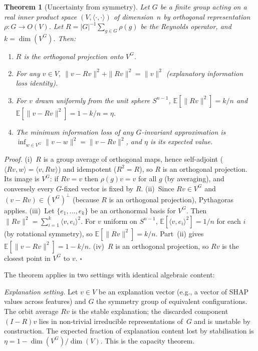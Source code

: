 \documentclass[11pt,a4paper]{article}
\newtheorem{theorem}{Theorem}[section]
\begin{document}
\begin{theorem}[Uncertainty from symmetry]
\label{thm:uncertainty-from-symmetry}
Let $G$ be a finite group acting on a real inner product space $(V, \langle\cdot,\cdot\rangle)$ of dimension~$n$ by orthogonal representation $\rho : G \to O(V)$.  Let $R = |G|^{-1} \sum_{g \in G} \rho(g)$ be the Reynolds operator, and $k = \dim(V^G)$.  Then:
\begin{enumerate}
  \item[(i)] $R$ is the orthogonal projection onto $V^G$.
  \item[(ii)] For any $v \in V$, $\|v - Rv\|^2 + \|Rv\|^2 = \|v\|^2$ \emph{(explanatory information loss identity)}.
  \item[(iii)] For $v$ drawn uniformly from the unit sphere $S^{n-1}$, $\mathbb{E}[\|Rv\|^2] = k/n$ and $\mathbb{E}[\|v - Rv\|^2] = 1 - k/n = \eta$.
  \item[(iv)] The minimum information loss of any $G$-invariant approximation is $\inf_{w \in V^G} \|v - w\|^2 = \|v - Rv\|^2$, and $\eta$ is its expected value.
\end{enumerate}
\end{theorem}

\emph{Proof.}
(i)~$R$ is a group average of orthogonal maps, hence self-adjoint ($\langle Rv, w\rangle = \langle v, Rw\rangle$) and idempotent ($R^2 = R$), so $R$ is an orthogonal projection.  Its image is $V^G$: if $Rv = v$ then $\rho(g)v = v$ for all $g$ (by averaging), and conversely every $G$-fixed vector is fixed by $R$.
(ii)~Since $Rv \in V^G$ and $(v - Rv) \in (V^G)^\perp$ (because $R$ is an orthogonal projection), Pythagoras applies.
(iii)~Let $\{e_1, \ldots, e_k\}$ be an orthonormal basis for $V^G$.  Then $\|Rv\|^2 = \sum_{i=1}^k \langle v, e_i\rangle^2$.  For $v$ uniform on $S^{n-1}$, $\mathbb{E}[\langle v, e_i\rangle^2] = 1/n$ for each $i$ (by rotational symmetry), so $\mathbb{E}[\|Rv\|^2] = k/n$.  Part~(ii) gives $\mathbb{E}[\|v - Rv\|^2] = 1 - k/n$.
(iv)~$R$ is an orthogonal projection, so $Rv$ is the closest point in $V^G$ to $v$.  \hfill$\square$

The theorem applies in two settings with identical algebraic content:

\emph{Explanation setting.}  Let $v \in V$ be an explanation vector (e.g., a vector of SHAP values across features) and $G$ the symmetry group of equivalent configurations.  The orbit average $Rv$ is the stable explanation; the discarded component $(I - R)v$ lies in non-trivial irreducible representations of~$G$ and is unstable by construction.  The expected fraction of explanation content lost by stabilisation is $\eta = 1 - \dim(V^G)/\dim(V)$.  This is the capacity theorem.
\end{document}
